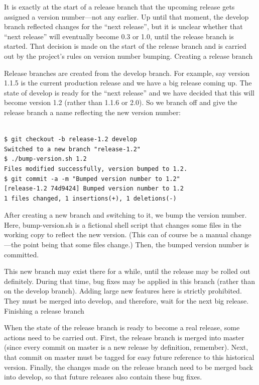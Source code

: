 It is exactly at the start of a release branch that the upcoming release gets
assigned a version number—not any earlier. Up until that moment, the develop
branch reflected changes for the “next release”, but it is unclear whether that
“next release” will eventually become 0.3 or 1.0, until the release branch is
started. That decision is made on the start of the release branch and is carried
out by the project’s rules on version number bumping. Creating a release branch

Release branches are created from the develop branch. For example, say version
1.1.5 is the current production release and we have a big release coming up. The
state of develop is ready for the “next release” and we have decided that this
will become version 1.2 (rather than 1.1.6 or 2.0). So we branch off and give the
release branch a name reflecting the new version number:
\\\\
\begin{verbatim}
$ git checkout -b release-1.2 develop
Switched to a new branch "release-1.2"
$ ./bump-version.sh 1.2
Files modified successfully, version bumped to 1.2.
$ git commit -a -m "Bumped version number to 1.2"
[release-1.2 74d9424] Bumped version number to 1.2
1 files changed, 1 insertions(+), 1 deletions(-)
\end{verbatim}

After creating a new branch and switching to it, we bump the version number.
Here, bump-version.sh is a fictional shell script that changes some files in the
working copy to reflect the new version. (This can of course be a manual
change—the point being that some files change.) Then, the bumped version number
is committed.

This new branch may exist there for a while, until the release may be rolled out
definitely. During that time, bug fixes may be applied in this branch (rather
than on the develop branch). Adding large new features here is strictly
prohibited. They must be merged into develop, and therefore, wait for the next
big release. Finishing a release branch

When the state of the release branch is ready to become a real release, some
actions need to be carried out. First, the release branch is merged into master
(since every commit on master is a new release by definition, remember). Next,
that commit on master must be tagged for easy future reference to this historical
version. Finally, the changes made on the release branch need to be merged back
into develop, so that future releases also contain these bug fixes.

